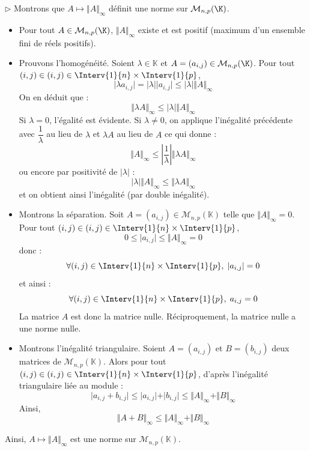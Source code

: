 \documentclass[a4paper,10pt]{report}
\begin{document}
\medskip

\noindent $\rhd$ Montrons que $A \mapsto \Vert A \Vert_{\infty}$ définit une norme sur $\mathcal{M}_{n,p}(\K)$.

\begin{itemize}
\item Pour tout $A \in \mathcal{M}_{n,p}(\K)$, $\Vert A \Vert_{\infty}$ existe et est positif (maximum d'un ensemble fini de réels positifs).
\item Prouvons l'homogénéité. Soient $\lambda \in \mathbb{K}$ et $A=(a_{i,j}) \in \mathcal{M}_{n,p}(\K)$. Pour tout $(i,j) \in (i,j) \in \Interv{1}{n} \times \Interv{1}{p}$,
$$ \vert \lambda a_{i,j} \vert = \vert \lambda \vert \vert a_{i,j}\vert \leq \vert \lambda \vert \Vert A \Vert_{\infty}$$
On en déduit que :
$$ \Vert \lambda A \Vert_{\infty} \leq \vert \lambda \vert \Vert A \Vert_{\infty}$$
Si $\lambda = 0$, l'égalité est évidente. Si $\lambda \neq 0$, on applique l'inégalité précédente avec $\dfrac{1}{\lambda}$ au lieu de $\lambda$ et $\lambda A$ au lieu de $A$ ce qui donne :
$$ \Vert  A \Vert_{\infty} \leq \left\vert \dfrac{1}{\lambda} \right\vert \Vert \lambda A \Vert_{\infty}$$
ou encore par positivité de $\vert \lambda \vert $ :
$$ \vert \lambda \vert \Vert A \Vert_{\infty} \leq \Vert \lambda A \Vert_{\infty}$$
et on obtient ainsi l'inégalité (par double inégalité).


\item Montrons la séparation. Soit $A=(a_{i,j}) \in \mathcal{M}_{n,p}(\mathbb{K})$ telle que $\Vert A \Vert_{\infty}=0$. Pour tout $(i,j) \in (i,j) \in \Interv{1}{n} \times \Interv{1}{p}$,
$$ 0 \leq \vert a_{i,j} \vert \leq \Vert A \Vert_{\infty}=0$$
donc :
$$ \forall (i,j) \in \Interv{1}{n} \times \Interv{1}{p}, \; \vert a_{i,j} \vert =0$$
et ainsi :
$$  \forall (i,j) \in \Interv{1}{n} \times \Interv{1}{p}, \;  a_{i,j}  =0$$
La matrice $A$ est donc la matrice nulle. Réciproquement, la matrice nulle a une norme nulle.
\item Montrons l'inégalité triangulaire. Soient $A=(a_{i,j})$ et $B=(b_{i,j})$ deux matrices de $\mathcal{M}_{n,p}(\mathbb{K})$. Alors pour tout $(i,j) \in (i,j) \in \Interv{1}{n} \times \Interv{1}{p}$, d'après l'inégalité triangulaire liée au module :
$$ \vert a_{i,j} + b_{i,j} \vert \leq \vert a_{i,j} \vert + \vert b_{i,j} \vert \leq \Vert A \Vert_{\infty} + \Vert B \Vert_{\infty}$$
Ainsi,
$$ \Vert A+B \Vert_{\infty}  \leq \Vert A \Vert_{\infty} + \Vert B \Vert_{\infty}$$
\end{itemize}
Ainsi, $A \mapsto \Vert A \Vert_{\infty}$ est une norme sur $\mathcal{M}_{n,p}(\mathbb{K})$.
\end{document}

